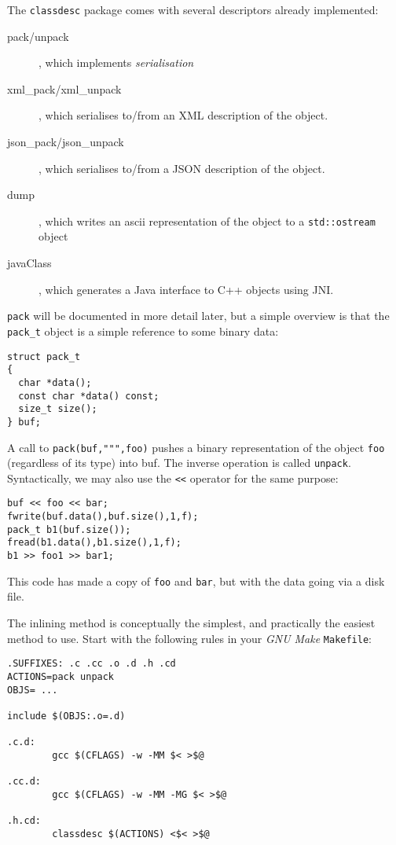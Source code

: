 The {\tt classdesc} package comes with several descriptors already
implemented:
\begin{description}
\item[pack/unpack], which implements {\em
serialisation}
\item[xml\_pack/xml\_unpack], which serialises to/from an
  XML description of the object.
\item[json\_pack/json\_unpack], which serialises to/from a
  JSON description of the object.
\item[dump], which writes an ascii representation of the
  object to a {\tt std::ostream} object
\item[javaClass], which generates a Java interface to
  C++ objects using JNI.
\end{description}
{\tt pack} will be documented in
more detail later, but a simple overview is that the {\tt pack\_t}
object is a simple reference to some binary data:
\begin{verbatim}
struct pack_t
{
  char *data();
  const char *data() const;
  size_t size();
} buf;
\end{verbatim}
A call to \verb+pack(buf,""",foo)+ pushes a binary representation of
the object {\tt foo} (regardless of its type) into buf. The inverse
operation is called {\tt unpack}. Syntactically, we may also use the
\verb+<<+ operator for the same purpose:
\begin{verbatim}
buf << foo << bar;
fwrite(buf.data(),buf.size(),1,f);
pack_t b1(buf.size());
fread(b1.data(),b1.size(),1,f);
b1 >> foo1 >> bar1;
\end{verbatim}
This code has made a copy of {\tt foo} and {\tt bar}, but with the
data going via a disk file.


The inlining method is conceptually the simplest, and practically the
easiest method to use. Start with the following rules in your {\em GNU
  Make} {\tt Makefile}:
\begin{verbatim}
.SUFFIXES: .c .cc .o .d .h .cd
ACTIONS=pack unpack
OBJS= ...

include $(OBJS:.o=.d)

.c.d: 
        gcc $(CFLAGS) -w -MM $< >$@

.cc.d: 
        gcc $(CFLAGS) -w -MM -MG $< >$@

.h.cd:
        classdesc $(ACTIONS) <$< >$@

\end{verbatim} 

